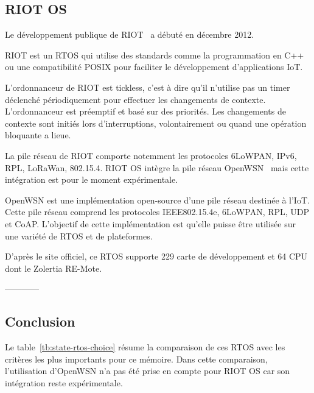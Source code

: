 \subsection*{RIOT OS}
    Le développement publique de RIOT~\cite{riotos} a débuté en décembre 2012\footnotemark[1].

    RIOT est un RTOS qui utilise des standards comme la programmation en C++ ou une compatibilité POSIX pour faciliter le développement d'applications IoT.

    L'ordonnanceur de RIOT est tickless, c'est à dire qu'il n'utilise pas un timer déclenché périodiquement pour effectuer les changements de contexte. L'ordonnanceur est préemptif et basé sur des priorités. Les changements de contexte sont initiés lors d'interruptions, volontairement ou quand une opération bloquante a lieue. 

    La pile réseau de RIOT comporte notemment les protocoles 6LoWPAN, IPv6, RPL, LoRaWan, 802.15.4.
    RIOT OS intègre la pile réseau OpenWSN~\cite{openwsn} mais cette intégration est pour le moment expérimentale.
    
    OpenWSN est une implémentation open-source d'une pile réseau destinée à l'IoT. Cette pile réseau comprend les protocoles IEEE802.15.4e, 6LoWPAN, RPL, UDP et CoAP. L'objectif de cette implémentation est qu'elle puisse être utilisée sur une variété de RTOS et de plateformes.

    D'après le site officiel, ce RTOS supporte 229 carte de développement et 64 CPU dont le Zolertia RE-Mote.


------------\\
\subsection*{Conclusion}
Le table~\ref{tb:state-rtos-choice} résume la comparaison de ces RTOS avec les critères les plus importants pour ce mémoire. Dans cette comparaison, l'utilisation d'OpenWSN n'a pas été prise en compte pour RIOT OS car son intégration reste expérimentale.

